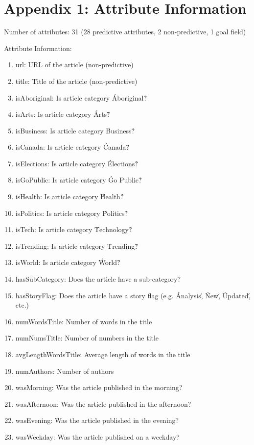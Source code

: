 \documentclass[conference,compsoc]{IEEEtran}
\begin{document}
\section{Appendix 1: Attribute Information}

Number of attributes: 31 (28 predictive attributes, 2 non-predictive, 1 goal field)

Attribute Information:
\begin{enumerate}
	\item url: URL of the article (non-predictive)
	\item title: Title of the article (non-predictive)
	\item isAboriginal: Is article category \'Aboriginal\'?
	\item isArts: Is article category \'Arts\'?
	\item isBusiness: Is article category \'Business\'?
	\item isCanada: Is article category \'Canada\'?
	\item isElections: Is article category \'Elections\'?
	\item isGoPublic: Is article category \'Go Public\'?
	\item isHealth: Is article category \'Health\'?
	\item isPolitics: Is article category \'Politics\'?
	\item isTech: Is article category \'Technology\'?
	\item isTrending: Is article category \'Trending\'?
	\item isWorld: Is article category \'World\'?
	\item hasSubCategory: Does the article have a sub-category?
	\item hasStoryFlag: Does the article have a story flag (e.g. \'Analysis\', \'New\', \'Updated\', etc.)
	\item numWordsTitle: Number of words in the title
	\item numNumsTitle: Number of numbers in the title
	\item avgLengthWordsTitle: Average length of words in the title
	\item numAuthors: Number of authors
	\item wasMorning: Was the article published in the morning?
	\item wasAfternoon: Was the article published in the afternoon?
	\item wasEvening: Was the article published in the evening?
	\item wasWeekday: Was the article published on a weekday?

\end{enumerate}
\end{document}
